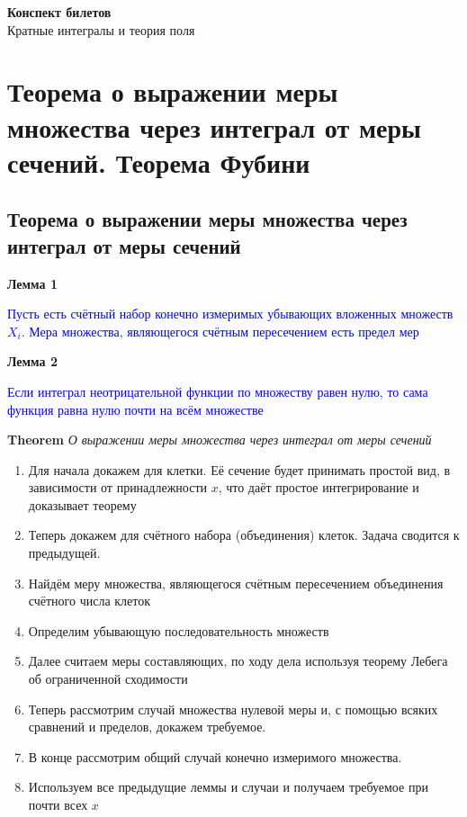 \documentclass[a4paper, 14pt]{article}
\begin{document}
{\huge
    \begin{center}
    {\textbf{Конспект билетов}}
        \\
        Кратные интегралы и теория поля
    \end{center}
}
    \tableofcontents \newpage
    
    \section{Теорема о выражении меры множества через интеграл от меры сечений.
    Теорема Фубини}
    
    \subsection{Теорема о выражении меры множества через интеграл от меры сечений}
    
    \textbf{Лемма 1}
    
    \textcolor{blue}{Пусть есть счётный набор конечно измеримых убывающих вложенных множеств $X_i$.
    Мера множества, являющегося счётным пересечением есть предел мер}
    
    \textbf{Лемма 2}
    
    \textcolor{blue}{Если интеграл неотрицательной функции по множеству равен нулю, то сама функция равна нулю почти
    на всём множестве}
    
    \textbf{Theorem} \textit{О выражении меры множества через интеграл от меры сечений}
    
    \begin{enumerate}
        \item Для начала докажем для клетки.
        Её сечение будет принимать простой вид, в зависимости от принадлежности $x$, что даёт простое
        интегрирование и доказывает теорему
        \item Теперь докажем для счётного набора (объединения) клеток.
        Задача сводится к предыдущей.
        \item Найдём меру множества, являющегося счётным пересечением объединения счётного числа клеток
        \item Определим убывающую последовательность множеств
        \item Далее считаем меры составляющих, по ходу дела используя теорему Лебега об ограниченной сходимости
        \item Теперь рассмотрим случай множества нулевой меры и, с помощью всяких сравнений и пределов, докажем
        требуемое.
        \item В конце рассмотрим общий случай конечно измеримого множества.
        \item Используем все предыдущие леммы и случаи и получаем требуемое при почти всех $x$
    \end{enumerate}
    
\end{document}
